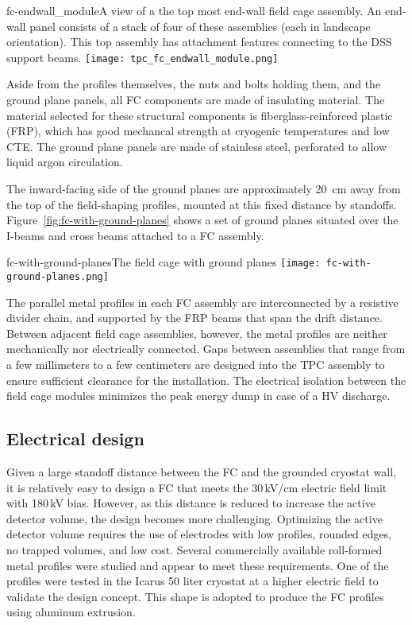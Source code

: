 \begin{cdrfigure}{fc-endwall_module}{A view of a the top most end-wall field cage assembly. An end-wall panel consists of a stack of four of these assemblies (each in landscape orientation).  This top assembly has attachment features connecting to the DSS support beams.}
\texttt{[image: tpc\_fc\_endwall\_module.png]}
\end{cdrfigure}

Aside from the profiles themselves, the nuts and bolts holding them, and the ground plane panels, all FC components are made of insulating material. The material selected for these structural components is fiberglass-reinforced plastic (FRP), which has good mechancal strength at cryogenic temperatures and low CTE. The ground plane panels are made of stainless steel, perforated to allow liquid argon circulation. 

The inward-facing side of the ground planes are approximately 20~cm away from the top of the field-shaping profiles, mounted at this fixed distance %
by standoffs. Figure~\ref{fig:fc-with-ground-planes} shows a set of ground planes situated over the I-beams and cross beams attached to a FC assembly.

\begin{cdrfigure}{fc-with-ground-planes}{The field cage with ground planes}
\texttt{[image: fc-with-ground-planes.png]}
\end{cdrfigure}

The parallel metal profiles in each FC assembly 
 are interconnected by a resistive divider chain, and supported by the FRP beams that span the drift distance.  Between adjacent field cage assemblies, however,  
the metal profiles are neither mechanically nor electrically connected. Gaps between assemblies that range from a few millimeters to a few centimeters are designed into the TPC assembly to ensure sufficient clearance for the installation.  The electrical isolation between the field cage modules minimizes the peak energy dump in case of a HV discharge.


\subsection{Electrical design}

Given a large standoff distance between the FC and the grounded cryostat wall, it is relatively easy to design a FC that meets the 30\,kV/cm electric field limit with 180\,kV bias.  However, as this distance is reduced to increase the active detector volume, the design becomes more challenging.  Optimizing the active detector volume requires the use of electrodes with low profiles, rounded edges, no trapped volumes, and low cost.  Several commercially available roll-formed metal profiles were studied and appear to meet these requirements. One of the profiles were tested in the Icarus 50 liter cryostat at a higher electric field to validate the design concept.  This shape is adopted to produce the FC profiles using aluminum extrusion.


